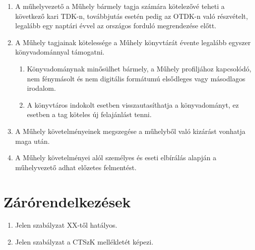 \documentclass{../styles/rulebook}
\begin{document}
\begin{enumerate}
\begin{enumerate}
	\end{enumerate}
	\item A műhelyvezető a Műhely bármely tagja számára kötelezővé teheti a következő kari
	TDK-n, továbbjutás esetén pedig az OTDK-n való részvételt, legalább egy naptári
	évvel az országos forduló megrendezése előtt.
	\item A Műhely tagjainak kötelessége a Műhely könyvtárát évente legalább egyszer
	könyvadománnyal támogatni.
	\begin{enumerate}
		\item Könyvadománynak minősülhet bármely, a Műhely profiljához kapcsolódó, nem fénymásolt és nem digitális formátumú elsődleges vagy másodlagos irodalom.
		\item A könyvtáros indokolt esetben visszautasíthatja a	könyvadományt, ez esetben a tag köteles új felajánlást tenni.
	\end{enumerate}
	\item A Műhely követelményeinek megszegése a műhelyből való kizárást vonhatja maga
	után. 
	\item A Műhely követelményei alól személyes és eseti elbírálás alapján a műhelyvezető
	adhat előzetes felmentést.
\end{enumerate}

\section{Zárórendelkezések}

\begin{enumerate}
	\item Jelen szabályzat XX-től hatályos.
	\item Jelen szabályzat a CTSzK mellékletét képezi.
\end{enumerate}
\end{document}
